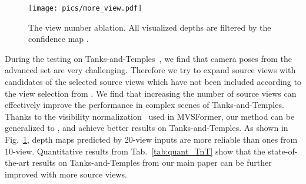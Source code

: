\documentclass[10pt]{article} \usepackage[preprint]{tmlr}
\begin{document}
 \begin{figure}[h]
 \begin{centering}
 \texttt{[image: pics/more\_view.pdf]} 
 \par\end{centering}
\caption{The view number ablation. All visualized depths are filtered by the confidence map .}
 \label{fig:more_view}
\vspace{-0.15in}
 \end{figure}
During the testing on Tanks-and-Temples~\citep{Knapitsch2017}, we find that camera poses from the advanced set are very challenging.
Therefore we try to expand source views with candidates of the selected source views which have not been included according to the view selection from \citet{yao2018mvsnet}.
We find that increasing the number of source views can effectively improve the performance in complex scenes of Tanks-and-Temples. Thanks to the visibility normalization~\citep{zhang2020visibility,giang2021curvature} used in MVSFormer, our method can be generalized to , and achieve better results on Tanks-and-Temples.
As shown in Fig.~\ref{fig:more_view}, depth maps predicted by 20-view inputs are more reliable than ones from 10-view. 
Quantitative results from Tab.~\ref{tab:quant_TnT} show that the state-of-the-art results on Tanks-and-Temples from our main paper can be further improved with more source views.
\end{document}
